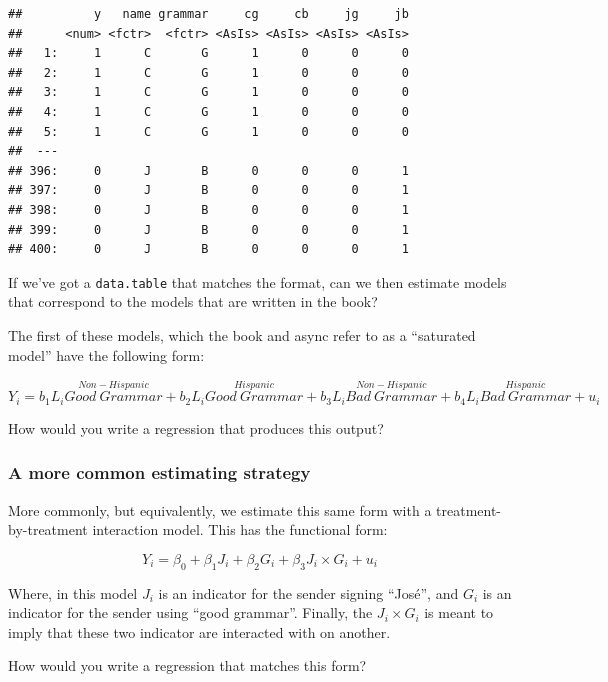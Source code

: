 \documentclass[
]{article}
\theoremstyle{definition}
\theoremstyle{definition}
\theoremstyle{definition}
\theoremstyle{definition}
\theoremstyle{remark}
\begin{document}
\begin{verbatim}
##          y   name grammar     cg     cb     jg     jb
##      <num> <fctr>  <fctr> <AsIs> <AsIs> <AsIs> <AsIs>
##   1:     1      C       G      1      0      0      0
##   2:     1      C       G      1      0      0      0
##   3:     1      C       G      1      0      0      0
##   4:     1      C       G      1      0      0      0
##   5:     1      C       G      1      0      0      0
##  ---                                                 
## 396:     0      J       B      0      0      0      1
## 397:     0      J       B      0      0      0      1
## 398:     0      J       B      0      0      0      1
## 399:     0      J       B      0      0      0      1
## 400:     0      J       B      0      0      0      1
\end{verbatim}

If we've got a \texttt{data.table} that matches the format, can we then estimate models that correspond to the models that are written in the book?

The first of these models, which the book and async refer to as a ``saturated model'' have the following form:

\[
Y_{i} = b_{1}L_{i}\overset{Non-Hispanic}{Good\ Grammar} + 
  b_{2}L_{i}\overset{Hispanic}{Good\ Grammar} + 
  b_{3}L_{i}\overset{Non-Hispanic}{Bad\ Grammar} + 
  b_{4}L_{i}\overset{Hispanic}{Bad\ Grammar} + 
  u_{i}
\]

How would you write a regression that produces this output?

\subsubsection{A more common estimating strategy}\label{a-more-common-estimating-strategy}

More commonly, but equivalently, we estimate this same form with a treatment-by-treatment interaction model. This has the functional form:

\[
Y_{i} = \beta_{0} + \beta_{1} J_{i} + \beta_{2} G_{i} + \beta_{3} J_{i}\times G_{i} + u_{i}
\]

Where, in this model \(J_{i}\) is an indicator for the sender signing ``José'', and \(G_{i}\) is an indicator for the sender using ``good grammar''. Finally, the \(J_{i}\times G_{i}\) is meant to imply that these two indicator are interacted with on another.

How would you write a regression that matches this form?
\end{document}
